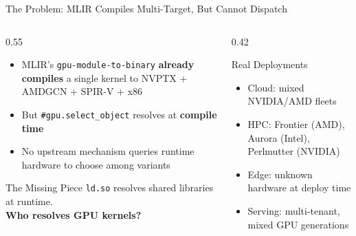 \documentclass[aspectratio=169,10pt]{beamer}
\begin{document}
\begin{frame}{The Problem: MLIR Compiles Multi-Target, But Cannot Dispatch}
  \begin{columns}[T]
    \begin{column}{0.55\textwidth}
      \begin{itemize}
        \item MLIR's \texttt{gpu-module-to-binary} \textbf{already compiles} a single kernel to NVPTX + AMDGCN + SPIR-V + x86
        \item But \texttt{\#gpu.select\_object} resolves at \textbf{compile time}
        \item No upstream mechanism queries runtime hardware to choose among variants
      \end{itemize}
      \vspace{1em}
      \begin{alertblock}{The Missing Piece}
        \texttt{ld.so} resolves shared libraries at runtime.\\
        \textbf{Who resolves GPU kernels?}
      \end{alertblock}
    \end{column}
    \begin{column}{0.42\textwidth}
      \begin{exampleblock}{Real Deployments}
        \begin{itemize}
          \item Cloud: mixed NVIDIA/AMD fleets
          \item HPC: Frontier (AMD), Aurora (Intel), Perlmutter (NVIDIA)
          \item Edge: unknown hardware at deploy time
          \item Serving: multi-tenant, mixed GPU generations
        \end{itemize}
      \end{exampleblock}
    \end{column}
  \end{columns}
\end{frame}
\end{document}
